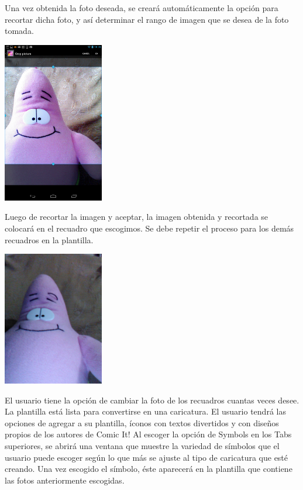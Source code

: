 \documentclass[12pt]{report}
\begin{document}
Una vez obtenida la foto deseada, se creará automáticamente la opción para recortar dicha foto, y así determinar el rango de imagen que se desea de la foto tomada.
\newline
	\begin{center}
		\begingroup
			\includegraphics[width=0.33\textwidth]{imagenes_usuario/crop.png}
		\endgroup
	\end{center}

Luego de recortar la imagen y aceptar, la imagen obtenida y recortada se colocará en el recuadro que escogimos. Se debe repetir el proceso para los demás recuadros en la plantilla.
\newline
	\begin{center}
		\begingroup
			\includegraphics[width=0.33\textwidth]{imagenes_usuario/foto.jpg}
		\endgroup
	\end{center}


El usuario tiene la opción de cambiar la foto de los recuadros cuantas veces desee.
La plantilla está lista para convertirse en una caricatura.
El usuario tendrá las opciones de agregar a su plantilla, íconos con textos divertidos  y con diseños propios de los autores de Comic It!
Al escoger la opción de Symbols en los Tabs superiores, se abrirá una ventana que muestre la variedad de símbolos que el usuario puede escoger según lo que más se ajuste al tipo de caricatura que esté creando. Una vez escogido el símbolo, éste aparecerá en la plantilla que contiene las fotos anteriormente escogidas.
\newline
\end{document}
